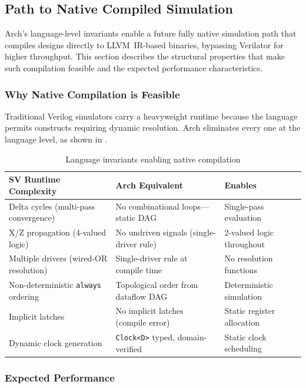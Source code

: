 \documentclass[11pt,twocolumn]{article}
\begin{document}
\subsection{Path to Native Compiled Simulation}

Arch's language-level invariants enable a future fully native simulation path that compiles designs directly to LLVM~IR-based binaries, bypassing Verilator for higher throughput. This section describes the structural properties that make such compilation feasible and the expected performance characteristics.

\subsubsection{Why Native Compilation is Feasible}

Traditional Verilog simulators carry a heavyweight runtime because the language permits constructs requiring dynamic resolution. Arch eliminates every one at the language level, as shown in .

\begin{table}[t]
\centering
\caption{Language invariants enabling native compilation}
\label{tab:simcompare}
\small
\begin{tabular}{@{}p{4.2cm}p{5.5cm}p{4.8cm}@{}}
\toprule
\textbf{SV Runtime Complexity} & \textbf{Arch Equivalent} & \textbf{Enables} \\
\midrule
Delta cycles (multi-pass convergence) & No combinational loops---static DAG & Single-pass evaluation \\
X/Z propagation (4-valued logic) & No undriven signals (single-driver rule) & 2-valued logic throughout \\
Multiple drivers (wired-OR resolution) & Single-driver rule at compile time & No resolution functions \\
Non-deterministic \texttt{always} ordering & Topological order from dataflow DAG & Deterministic simulation \\
Implicit latches & No implicit latches (compile error) & Static register allocation \\
Dynamic clock generation & \texttt{Clock<D>} typed, domain-verified & Static clock scheduling \\
\bottomrule
\end{tabular}
\end{table}

\subsubsection{Expected Performance}
\end{document}
